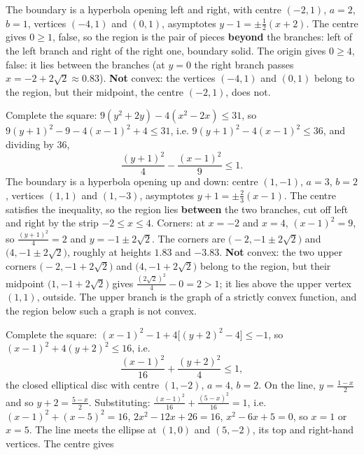 \begin{solutions}
\[        \]
        The boundary is a hyperbola opening left and right, with centre
        $(-2,1)$, $a=2$, $b=1$, vertices $(-4,1)$ and $(0,1)$, asymptotes
        $y-1=\pm\tfrac12(x+2)$. The centre gives $0\ge1$, false, so the
        region is the pair of pieces \textbf{beyond} the branches: left of
        the left branch and right of the right one, boundary solid. The
        origin gives $0\ge4$, false: it lies between the branches (at
        $y=0$ the right branch passes $x=-2+2\sqrt2\approx0.83$).
        \textbf{Not} convex: the vertices $(-4,1)$ and $(0,1)$ belong to
        the region, but their midpoint, the centre $(-2,1)$, does not.
  \item Complete the square: $9(y^{2}+2y)-4(x^{2}-2x)\le31$, so
        $9(y+1)^{2}-9-4(x-1)^{2}+4\le31$, i.e.
        $9(y+1)^{2}-4(x-1)^{2}\le36$, and dividing by $36$,
        \[
          \frac{(y+1)^{2}}{4}-\frac{(x-1)^{2}}{9}\le1 .
        \]
        The boundary is a hyperbola opening up and down: centre $(1,-1)$,
        $a=3$, $b=2$, vertices $(1,1)$ and $(1,-3)$, asymptotes
        $y+1=\pm\tfrac23(x-1)$. The centre satisfies the inequality, so the
        region lies \textbf{between} the two branches, cut off left and
        right by the strip $-2\le x\le4$. Corners: at $x=-2$ and $x=4$,
        $(x-1)^{2}=9$, so $\tfrac{(y+1)^{2}}{4}=2$ and $y=-1\pm2\sqrt2$.
        The corners are $\bigl(-2,-1\pm2\sqrt2\bigr)$ and
        $\bigl(4,-1\pm2\sqrt2\bigr)$, roughly at heights $1.83$ and
        $-3.83$. \textbf{Not} convex: the two upper corners
        $\bigl(-2,-1+2\sqrt2\bigr)$ and $\bigl(4,-1+2\sqrt2\bigr)$ belong
        to the region, but their midpoint $\bigl(1,-1+2\sqrt2\bigr)$ gives
        $\tfrac{(2\sqrt2)^{2}}{4}-0=2>1$; it lies above the upper vertex
        $(1,1)$, outside. The upper branch is the graph of a strictly
        convex function, and the region below such a graph is not convex.
  \item Complete the square:
        $(x-1)^{2}-1+4\bigl[(y+2)^{2}-4\bigr]\le-1$, so
        $(x-1)^{2}+4(y+2)^{2}\le16$, i.e.
        \[
          \frac{(x-1)^{2}}{16}+\frac{(y+2)^{2}}{4}\le1 ,
        \]
        the closed elliptical disc with centre $(1,-2)$, $a=4$, $b=2$. On
        the line, $y=\tfrac{1-x}{2}$ and so $y+2=\tfrac{5-x}{2}$.
        Substituting:
        $\tfrac{(x-1)^{2}}{16}+\tfrac{(5-x)^{2}}{16}=1$, i.e.
        $(x-1)^{2}+(x-5)^{2}=16$, $2x^{2}-12x+26=16$, $x^{2}-6x+5=0$, so
        $x=1$ or $x=5$. The line meets the ellipse at $(1,0)$ and
        $(5,-2)$, its top and right-hand vertices. The centre gives

\end{solutions}
